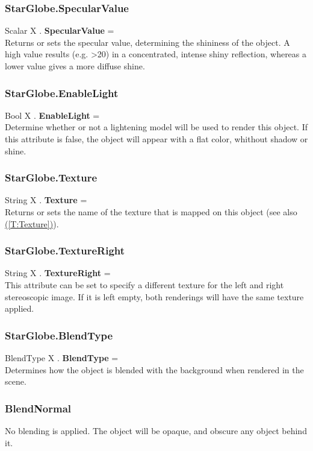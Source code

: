 \documentclass[10pt]{book}
\newcommand{\linkitem}[1]{\hyperref[#1]{\nameref{#1} (\ref{#1})}}
\begin{document}
\subsubsection{StarGlobe.SpecularValue \label{F:StarGlobe:SpecularValue}}
Scalar X . \textbf{SpecularValue} = \\
Returns or sets the specular value, determining the shininess of the object. A high value results (e.g. >20) in a concentrated, intense shiny reflection, whereas a lower value gives a more diffuse shine.

\subsubsection{StarGlobe.EnableLight \label{F:StarGlobe:EnableLight}}
Bool X . \textbf{EnableLight} = \\
Determine whether or not a lightening model will be used to render this object. If this attribute is false, the object will appear with a flat color, whithout shadow or shine.

\subsubsection{StarGlobe.Texture \label{F:StarGlobe:Texture}}
String X . \textbf{Texture} = \\
Returns or sets the name of the texture that is mapped on this object (see also \linkitem{T:Texture}).

\subsubsection{StarGlobe.TextureRight \label{F:StarGlobe:TextureRight}}
String X . \textbf{TextureRight} = \\
This attribute can be set to specify a different texture for the left and right stereoscopic image. If it is left empty, both renderings will have the same texture applied.

\subsubsection{StarGlobe.BlendType \label{F:StarGlobe:BlendType}}
BlendType X . \textbf{BlendType} = \\
Determines how the object is blended with the background when rendered in the scene.

\subsubsection{BlendNormal \label{T:BlendType|BlendNormal}}
No blending is applied. The object will be opaque, and obscure any object behind it.
\end{document}
